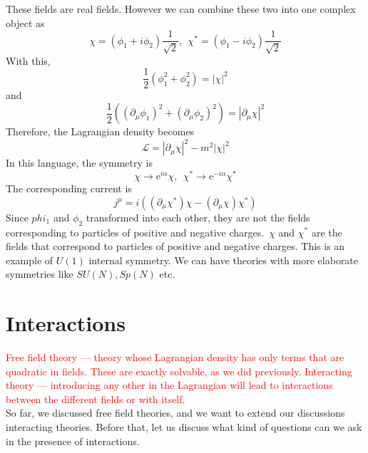 \documentclass[11pt]{article}
\newcommand{\del}{\partial}
\newcommand{\e}{\mathrm{e}}
\newcommand{\ld}{\mathcal{L}}
\numberwithin{equation}{section}
\begin{document}
    These fields are real fields. However we can combine these two into one complex object as
    \begin{equation*}
        \chi = (\phi_1 + i\phi_2)\frac{1}{\sqrt{2}},~~\chi^* = (\phi_1 - i\phi_2)\frac{1}{\sqrt{2}}
    \end{equation*}
    With this, 
    \begin{equation*}
        \frac{1}{2}(\phi_1^2 + \phi_2^2) = |\chi|^2
    \end{equation*}
    and 
    \begin{equation*}
        \frac{1}{2} ((\del_\mu \phi_1)^2 + (\del_\mu \phi_2)^2) = |\del_\mu \chi|^2
    \end{equation*}
    Therefore, the Lagrangian density becomes
    \begin{equation*}
        \ld = |\del_\mu \chi|^2 - m^2 |\chi|^2
    \end{equation*}
    In this language, the symmetry is
    \begin{equation*}
        \chi \to \e^{i\alpha} \chi,~~\chi^* \to \e^{-i\alpha}\chi^*
    \end{equation*}
    The corresponding current is 
    \begin{equation*}
        j^\mu = i((\del_\mu \chi^*) \chi - (\del_\mu\chi)\chi^*)
    \end{equation*}
    Since \(phi_1\) and \(\phi_2\) transformed into each other, they are not the fields corresponding to particles of positive and negative charges.\ \(\chi\) and \(\chi^*\) are the fields that correspond to particles of positive and negative charges. This is an example of \(U(1)\) internal symmetry. We can have theories with more elaborate symmetries like \(SU(N), Sp(N)\) etc.

    \newpage 
    \section{Interactions}

    \textcolor{red}{Free field theory — theory whose Lagrangian density has only terms that are quadratic in fields. These are exactly solvable, as we did previously. Interacting theory — introducing any other in the Lagrangian will lead to interactions between the different fields or with itself.}\\

    So far, we discussed free field theories, and we want to extend our discussions interacting theories. Before that, let us discuss what kind of questions can we ask in the presence of interactions. 
\end{document}
